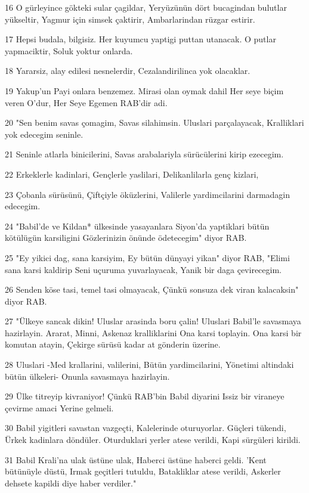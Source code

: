 \par 16 O gürleyince gökteki sular çagildar, Yeryüzünün dört bucagindan bulutlar yükseltir, Yagmur için simsek çaktirir, Ambarlarindan rüzgar estirir.
\par 17 Hepsi budala, bilgisiz. Her kuyumcu yaptigi puttan utanacak. O putlar yapmaciktir, Soluk yoktur onlarda.
\par 18 Yararsiz, alay edilesi nesnelerdir, Cezalandirilinca yok olacaklar.
\par 19 Yakup'un Payi onlara benzemez. Mirasi olan oymak dahil Her seye biçim veren O'dur, Her Seye Egemen RAB'dir adi.
\par 20 "Sen benim savas çomagim, Savas silahimsin. Uluslari parçalayacak, Kralliklari yok edecegim seninle.
\par 21 Seninle atlarla binicilerini, Savas arabalariyla sürücülerini kirip ezecegim.
\par 22 Erkeklerle kadinlari, Gençlerle yaslilari, Delikanlilarla genç kizlari,
\par 23 Çobanla sürüsünü, Çiftçiyle öküzlerini, Valilerle yardimcilarini darmadagin edecegim.
\par 24 "Babil'de ve Kildan* ülkesinde yasayanlara Siyon'da yaptiklari bütün kötülügün karsiligini Gözlerinizin önünde ödetecegim" diyor RAB.
\par 25 "Ey yikici dag, sana karsiyim, Ey bütün dünyayi yikan" diyor RAB, "Elimi sana karsi kaldirip Seni uçuruma yuvarlayacak, Yanik bir daga çevirecegim.
\par 26 Senden köse tasi, temel tasi olmayacak, Çünkü sonsuza dek viran kalacaksin" diyor RAB.
\par 27 "Ülkeye sancak dikin! Uluslar arasinda boru çalin! Uluslari Babil'le savasmaya hazirlayin. Ararat, Minni, Askenaz kralliklarini Ona karsi toplayin. Ona karsi bir komutan atayin, Çekirge sürüsü kadar at gönderin üzerine.
\par 28 Uluslari -Med krallarini, valilerini, Bütün yardimcilarini, Yönetimi altindaki bütün ülkeleri- Onunla savasmaya hazirlayin.
\par 29 Ülke titreyip kivraniyor! Çünkü RAB'bin Babil diyarini Issiz bir viraneye çevirme amaci Yerine gelmeli.
\par 30 Babil yigitleri savastan vazgeçti, Kalelerinde oturuyorlar. Güçleri tükendi, Ürkek kadinlara döndüler. Oturduklari yerler atese verildi, Kapi sürgüleri kirildi.
\par 31 Babil Krali'na ulak üstüne ulak, Haberci üstüne haberci geldi. 'Kent bütünüyle düstü, Irmak geçitleri tutuldu, Batakliklar atese verildi, Askerler dehsete kapildi diye haber verdiler."
